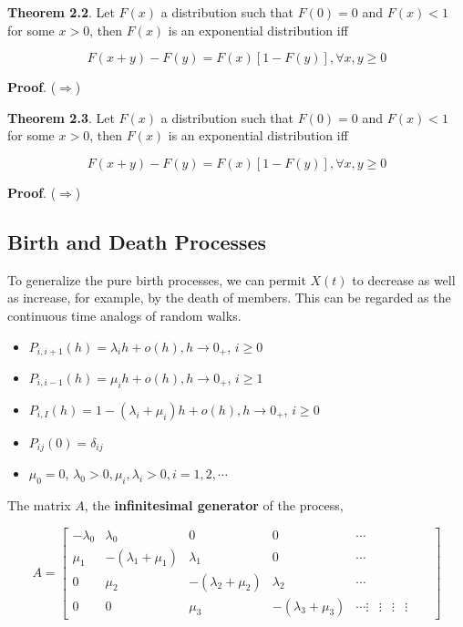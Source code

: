 \documentclass[12pt]{article}
\theoremstyle{nonumberbreak}
\begin{document}
\begin{theorem}
\textbf{Theorem 2.2}. Let $F(x)$ a distribution such that $F(0) = 0$ and $F(x) < 1$ for some $x >0 $, then $F(x)$ is an exponential distribution iff

$$
F(x+y) - F(y) = F(x)[1-F(y)], \forall x,y \ge 0
$$
\end{theorem}

\textbf{Proof}. ($\Rightarrow$) 




\begin{theorem}
\textbf{Theorem 2.3}. Let $F(x)$ a distribution such that $F(0) = 0$ and $F(x) < 1$ for some $x >0 $, then $F(x)$ is an exponential distribution iff

$$
F(x+y) - F(y) = F(x)[1-F(y)], \forall x,y \ge 0
$$
\end{theorem}

\textbf{Proof}. ($\Rightarrow$) 




\subsection{Birth and Death Processes}

To generalize the pure birth processes, we can permit $X(t)$ to decrease as well as increase, for example, by the death of members. This can be regarded as the continuous time analogs of random walks. 


\begin{itemize}
	\item $P_{i, i+1}(h) = \lambda_i h + o(h), h \to 0_+$, $i \ge 0$
	\item $P_{i, i-1}(h) = \mu_i h + o(h), h \to 0_+$, $i \ge 1$
	\item $P_{i,I} (h) = 1 -(\lambda_i + \mu_i) h + o(h), h \to 0_+$, $i \ge 0$
	\item $P_{ij} (0) = \delta_{ij}$
	\item $\mu_0 = 0$, $\lambda_0 > 0, \mu_i, \lambda_i > 0, i=1,2,\cdots$
\end{itemize}

The matrix $A$, the \textbf{infinitesimal generator} of the process,

$$
A = \begin{bmatrix}
-\lambda_0 & \lambda_0 & 0 & 0 & \cdots \\
\mu_1 & -(\lambda_1 + \mu_1)  & \lambda_1 & 0 & \cdots \\
0 & \mu_2 & -(\lambda_2 + \mu_2) & \lambda_2 & \cdots \\
0 & 0 & \mu_3 & -(\lambda_3 + \mu_3) & \cdots
\vdots & \vdots &  \vdots &  \vdots &   & 
\end{bmatrix}
$$
\end{document}
